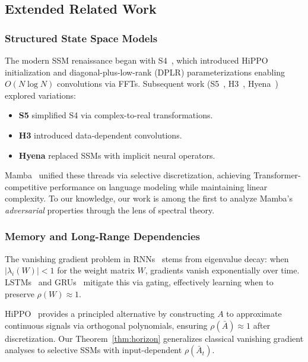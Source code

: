 \documentclass[10pt,twocolumn]{article}
\begin{document}
\subsection{Extended Related Work}
\label{sec:related}

\subsubsection{Structured State Space Models}

The modern SSM renaissance began with S4~\cite{gu2021efficiently}, which introduced HiPPO initialization and diagonal-plus-low-rank (DPLR) parameterizations enabling $O(N \log N)$ convolutions via FFTs. Subsequent work (S5~\cite{smith2023s5}, H3~\cite{dao2022hungry}, Hyena~\cite{poli2023hyena}) explored variations:
\begin{itemize}
\item \textbf{S5} simplified S4 via complex-to-real transformations.
\item \textbf{H3} introduced data-dependent convolutions.
\item \textbf{Hyena} replaced SSMs with implicit neural operators.
\end{itemize}

Mamba~\cite{gu2023mamba} unified these threads via selective discretization, achieving Transformer-competitive performance on language modeling while maintaining linear complexity. To our knowledge, our work is among the first to analyze Mamba's \emph{adversarial} properties through the lens of spectral theory.

\subsubsection{Memory and Long-Range Dependencies}

The vanishing gradient problem in RNNs~\cite{bengio1994learning,hochreiter1997lstm} stems from eigenvalue decay: when $|\lambda_i(W)| < 1$ for the weight matrix $W$, gradients vanish exponentially over time. LSTMs~\cite{hochreiter1997lstm} and GRUs~\cite{cho2014learning} mitigate this via gating, effectively learning when to preserve $\rho(W) \approx 1$.

HiPPO~\cite{gu2020hippo} provides a principled alternative by constructing $A$ to approximate continuous signals via orthogonal polynomials, ensuring $\rho(\bar{A}) \approx 1$ after discretization. Our Theorem~\ref{thm:horizon} generalizes classical vanishing gradient analyses to selective SSMs with input-dependent $\rho(\bar{A}_t)$.
\end{document}
